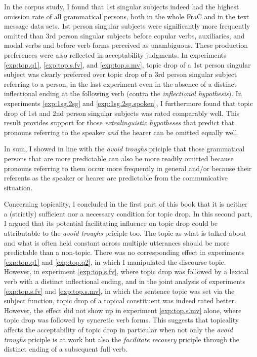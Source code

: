 In the corpus study,  I found that 1st singular subjects indeed had the highest omission rate of all grammatical persons, both in the whole FraC and in the text message data sets.
1st person singular subjects were significantly more frequently omitted than 3rd person singular subjects before copular verbs, auxiliaries, and modal verbs and before verb forms perceived as unambiguous.    
These production preferences were also reflected in acceptability judgments.
In experiments \ref*{exp:top.q1}, \ref*{exp:top.s.fv}, and \ref*{exp:top.s.mv}, topic drop of a 1st person singular subject was clearly preferred over topic drop of a 3rd person singular subject referring to a person, in the last experiment even in the absence of a distinct inflectional ending  at the following verb (contra the \textit{inflectional hypothesis}).
In experiments \ref*{exp:1sg.2sg} and \ref*{exp:1sg.2sg.spoken}, I furthermore found that topic drop of 1st and 2nd person singular subjects was rated comparably well.
This result provides support for those \textit{extralinguistic hypotheses} that predict that pronouns referring to the speaker \textit{and} the hearer can be omitted equally well.

In sum, I showed in line with the \textit{avoid troughs} priciple that those grammatical persons that are more predictable  can also be more readily omitted because pronouns referring to them occur more frequently in general and/or because their referents as the speaker or hearer are predictable from the communicative situation. 

Concerning topicality, I concluded in the first part of this book that it is neither a (strictly) sufficient nor a necessary condition for topic drop.
In this second part, I argued that its potential facilitating influence on topic drop could be attributable to the \textit{avoid troughs} priciple too.
The topic  as what is talked about and what is often held constant across multiple utterances should be more predictable  than a non-topic.
There was no corresponding effect in experiments \ref*{exp:top.q1} and \ref*{exp:top.q2}, in which I manipulated the discourse topic. 
However, in experiment \ref*{exp:top.s.fv}, where topic drop was followed by a lexical verb  with a distinct inflectional ending,  and in the joint analysis of experiments \ref*{exp:top.s.fv} and \ref*{exp:top.s.mv}, in which the sentence topic  was set via the subject function, topic drop of a topical constituent was indeed rated better.
However, the effect did not show up in experiment \ref*{exp:top.s.mv} alone, where topic drop was followed by syncretic  verb forms.
This suggests that topicality affects the acceptability of topic drop in particular when not only the \textit{avoid troughs} priciple is at work but also the \textit{facilitate recovery} priciple  through the distinct ending of a subsequent full verb.

